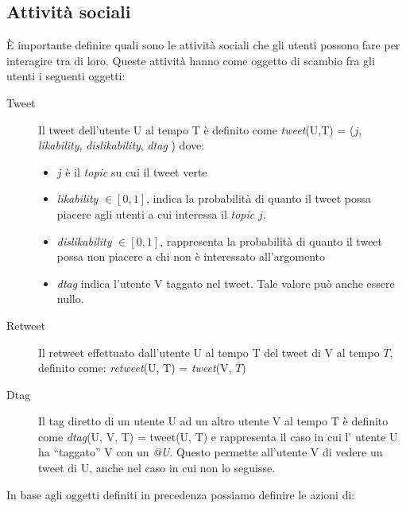 \documentclass[a4paper,12pt]{article}
\begin{document}
\subsection{Attivit\`a sociali}
\label{subsec:social}
\`E importante definire quali sono le attivit\`a sociali che gli utenti possono fare per interagire tra di loro. Queste attività hanno come oggetto di scambio fra gli utenti i seguenti oggetti:

\begin{description}
  \item[Tweet] Il tweet dell'utente U al tempo T \`e definito come
  \textit{tweet}(U,T) = ($j$, \textit{likability}, \textit{dislikability}, \textit{dtag}
  ) dove:
  \begin{itemize}
    \item $j$ \`e il \textit{topic} su cui il tweet verte
    \item \textit{likability} $\in [0,1]$, indica la probabilit\`a di quanto
    il tweet possa piacere agli utenti a cui interessa il 
    \textit{topic} $j$. 
    \item \textit{dislikability} $\in [0,1]$, rappresenta la probabilit\`a di quanto il tweet 
    possa non piacere a chi non \`e interessato all'argomento
    \item \textit{dtag} indica l'utente V taggato nel tweet. Tale valore 
    pu\`o anche essere nullo.
  \end{itemize}
  
  \item[Retweet] Il retweet effettuato dall'utente U al tempo T
  del tweet di V al tempo $\overline{T}$, definito come:
  \textit{retweet}(U, T) = \textit{tweet}(V, $\overline{T}$)
  
  \item[Dtag] Il tag diretto di un utente U ad un altro utente V al 
  tempo T \`e definito come \textit{dtag}(U, V, T) = tweet(U, T) e 
  rappresenta il caso in cui l' utente U ha ``taggato'' V con un 
  \textit{@U}. Questo permette all'utente V di vedere un tweet 
  di U, anche nel caso in cui non lo seguisse.
\end{description}
In base agli oggetti definiti in precedenza possiamo definire le 
azioni di:
\end{document}
